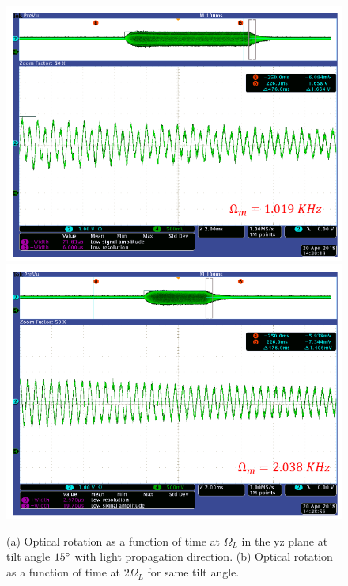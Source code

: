 \begin{figure}
  \centering
  \includegraphics[width=.8\textwidth,trim={0cm 0cm 0cm 0cm},clip]{figures/transversefield_2.png}
        \includegraphics[width=.8\textwidth,trim={0cm 0cm 0cm 0cm},clip]{figures/transversefield}
    \caption{(a) Optical rotation as a function of time at $\Omega_L$
      in the yz plane at tilt angle $15\degree$ with light propagation
      direction. (b) Optical rotation as a function of time at
      $2\Omega_L$ for same tilt angle.}
    \label{fig:tilted-scope}
\end{figure}


